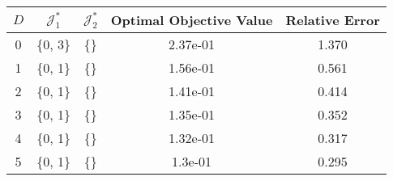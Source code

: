 \begin{subtable}{\textwidth}
\centering
\begin{tabular}{|c|c|c|c|c|}
  \hline
$D$ & $\mathcal J_1^*$ & $\mathcal J_2^*$ & Optimal Objective Value & Relative Error \\ 
  \hline
0 & \{0, 3\} & \{\} & 2.37e-01 & 1.370 \\ 
  1 & \{0, 1\} & \{\} & 1.56e-01 & 0.561 \\ 
  2 & \{0, 1\} & \{\} & 1.41e-01 & 0.414 \\ 
  3 & \{0, 1\} & \{\} & 1.35e-01 & 0.352 \\ 
  4 & \{0, 1\} & \{\} & 1.32e-01 & 0.317 \\ 
  5 & \{0, 1\} & \{\} & 1.3e-01 & 0.295 \\ 
   \hline
\end{tabular}
\end{subtable}
